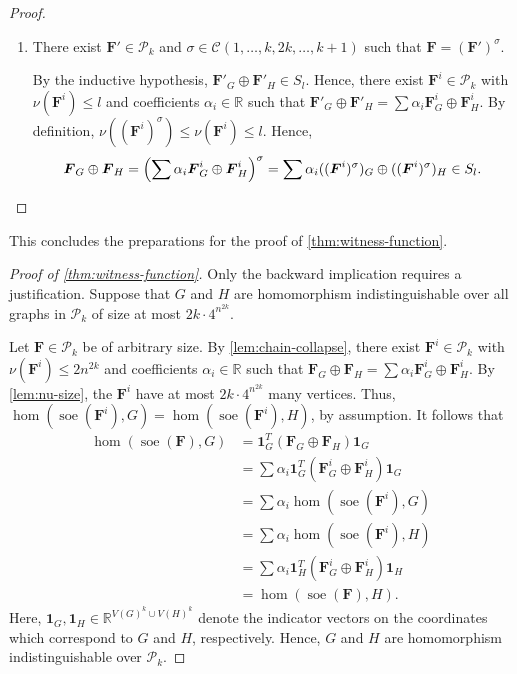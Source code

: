 \documentclass[a4paper,onecolumn,11pt,accepted=2026-01-06]{quantumarticle}
\theoremstyle{plain}
\theoremstyle{remark}
\theoremstyle{definition}
\DeclareMathOperator{\soe}{soe}
\newcommand{\cyclicpermutations}{\mathscr{C}(1,\dots, k, 2k, \dots, k+1)}
\begin{document}
\begin{proof}
\begin{enumerate}
		\item There exist $\boldsymbol{F}' \in \mathcal{P}_k$ and $\sigma \in \cyclicpermutations$ such that $\boldsymbol{F} = (\boldsymbol{F}')^\sigma$.
		
		By the inductive hypothesis, $\boldsymbol{F}'_G \oplus \boldsymbol{F}'_H \in S_l$.
		Hence, there exist $\boldsymbol{F}^i \in \mathcal{P}_k$ with $\nu(\boldsymbol{F}^i) \leq l$ and coefficients $\alpha_i \in \mathbb{R}$ such that $\boldsymbol{F}'_G \oplus \boldsymbol{F}'_H  = \sum \alpha_i \boldsymbol{F}^i_G \oplus \boldsymbol{F}^i_H$.
		By definition, $\nu((\boldsymbol{F}^i)^\sigma) \leq \nu(\boldsymbol{F}^i) \leq l$.
		Hence,
		\[
		\boldsymbol{F}_G \oplus \boldsymbol{F}_H = \left( \sum \alpha_i \boldsymbol{F}^i_G \oplus \boldsymbol{F}^i_H \right)^\sigma
		= \sum \alpha_i ((\boldsymbol{F}^i)^\sigma)_G \oplus ((\boldsymbol{F}^i)^\sigma)_H
		\in S_l. \qedhere
		\] 
	\end{enumerate} 
\end{proof}

This concludes the preparations for the proof of \cref{thm:witness-function}.
\begin{proof}[Proof of \cref{thm:witness-function}]
	Only the backward implication requires a justification.
	Suppose that $G$ and $H$ are homomorphism indistinguishable over all graphs in $\mathcal{P}_k$ of size at most $2k \cdot 4^{n^{2k}}$.
	
	Let $\boldsymbol{F} \in \mathcal{P}_k$ be of arbitrary size.
	By \cref{lem:chain-collapse}, there exist $\boldsymbol{F}^i \in \mathcal{P}_k$ with $\nu(\boldsymbol{F}^i) \leq 2n^{2k}$ and coefficients $\alpha_i \in \mathbb{R}$ such that
	$\boldsymbol{F}_G \oplus \boldsymbol{F}_H = \sum \alpha_i \boldsymbol{F}^i_G \oplus \boldsymbol{F}^i_H$.
	By \cref{lem:nu-size}, the $\boldsymbol{F}^i$ have at most $2k \cdot 4^{n^{2k}}$ many vertices.
	Thus, $ \hom(\soe(\boldsymbol{F}^i), G) =  \hom(\soe(\boldsymbol{F}^i), H)$, by assumption.
	It follows that
	\begin{align*}
		\hom(\soe(\boldsymbol{F}), G)
		&= \boldsymbol{1}_G^T (\boldsymbol{F}_G \oplus \boldsymbol{F}_H) \boldsymbol{1}_G \\
		&= \sum \alpha_i \boldsymbol{1}_G^T (\boldsymbol{F}^i_G \oplus \boldsymbol{F}^i_H) \boldsymbol{1}_G \\
		&= \sum \alpha_i \hom(\soe(\boldsymbol{F}^i), G) \\
		&= \sum \alpha_i \hom(\soe(\boldsymbol{F}^i), H) \\
		&= \sum \alpha_i \boldsymbol{1}_H^T (\boldsymbol{F}^i_G \oplus \boldsymbol{F}^i_H) \boldsymbol{1}_H \\
		&= \hom(\soe(\boldsymbol{F}), H).
	\end{align*}	
	Here, $\boldsymbol{1}_G, \boldsymbol{1}_H \in \mathbb{R}^{V(G)^k \cup V(H)^k}$ denote the indicator vectors on the coordinates which correspond to $G$ and $H$, respectively.
	Hence, $G$ and $H$ are homomorphism indistinguishable over $\mathcal{P}_k$.
\end{proof}
\end{document}
